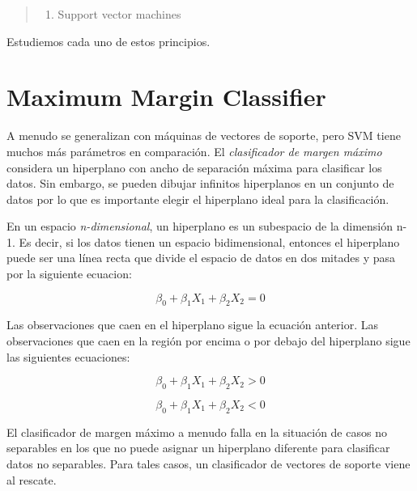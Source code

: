 \documentclass[
]{book}
\providecommand{\tightlist}{%
  \setlength{\itemsep}{0pt}\setlength{\parskip}{0pt}}
\begin{document}
\begin{quote}
\begin{enumerate}
\def\labelenumi{\arabic{enumi}.}
\setcounter{enumi}{2}
\tightlist
\item
  Support vector machines
\end{enumerate}
\end{quote}

Estudiemos cada uno de estos principios.

\hypertarget{maximum-margin-classifier}{%
\section{Maximum Margin Classifier}\label{maximum-margin-classifier}}

A menudo se generalizan con máquinas de vectores de soporte, pero SVM tiene muchos más parámetros en comparación. El \emph{clasificador de margen máximo} considera un hiperplano con ancho de separación máxima para clasificar los datos. Sin embargo, se pueden dibujar infinitos hiperplanos en un conjunto de datos por lo que es importante elegir el hiperplano ideal para la clasificación.

En un espacio \emph{n-dimensional}, un hiperplano es un subespacio de la dimensión n-1. Es decir, si los datos tienen un espacio bidimensional, entonces el hiperplano puede ser una línea recta que divide el espacio de datos en dos mitades y pasa por la siguiente ecuacion:

\[\beta_0 + \beta_1X_1 + \beta_2X_2=0\]

Las observaciones que caen en el hiperplano sigue la ecuación anterior. Las observaciones que caen en la región por encima o por debajo del hiperplano sigue las siguientes ecuaciones:

\[\beta_0 + \beta_1X_1 + \beta_2X_2>0\]

\[\beta_0 + \beta_1X_1 + \beta_2X_2<0\]

El clasificador de margen máximo a menudo falla en la situación de casos no separables en los que no puede asignar un hiperplano diferente para clasificar datos no separables. Para tales casos, un clasificador de vectores de soporte viene al rescate.
\end{document}
